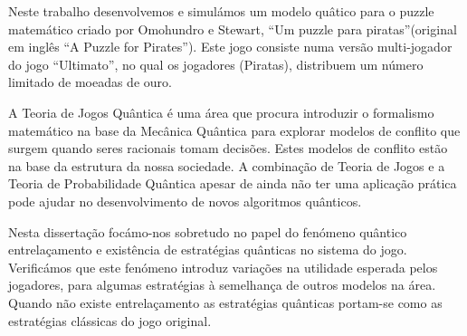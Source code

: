 \begin{resumo}

Neste trabalho desenvolvemos e simul\'{a}mos um modelo qu\^{a}tico para o puzzle matem\'{a}tico criado por Omohundro e Stewart, ``Um puzzle para piratas''(original em ingl\^{e}s ``A Puzzle for Pirates''). Este jogo consiste numa vers\~{a}o multi-jogador do jogo ``Ultimato'', no qual os jogadores (Piratas), distribuem um número limitado de moeadas de ouro.

A Teoria de Jogos Qu\^{a}ntica \'{e} uma \'{a}rea que procura introduzir o formalismo matem\'{a}tico na base da Mec\^{a}nica Qu\^{a}ntica para explorar modelos de conflito que surgem quando seres racionais tomam decis\~{o}es. Estes modelos de conflito est\~{a}o na base da estrutura da nossa sociedade. A combina\c{c}\~{a}o de Teoria de Jogos e a Teoria de Probabilidade Qu\^{a}ntica apesar de ainda n\~{a}o ter uma aplica\c{c}\~{a}o pr\'{a}tica pode ajudar no desenvolvimento de novos algoritmos qu\^{a}nticos. 

Nesta disserta\c{c}\~{a}o foc\'{a}mo-nos sobretudo no papel do fen\'{o}meno qu\^{a}ntico entrela\c{c}amento e exist\^{e}ncia de estrat\'{e}gias qu\^{a}nticas no sistema do jogo. Verific\'{a}mos que este fen\'{o}meno introduz varia\c{c}\~{o}es na utilidade esperada pelos jogadores, para algumas estrat\'{e}gias \`{a} semelhan\c{c}a de outros modelos na \'{a}rea. Quando n\~{a}o existe entrela\c{c}amento as estrat\'{e}gias qu\^{a}nticas portam-se como as estrat\'{e}gias cl\'{a}ssicas do jogo original. 



\end{resumo}